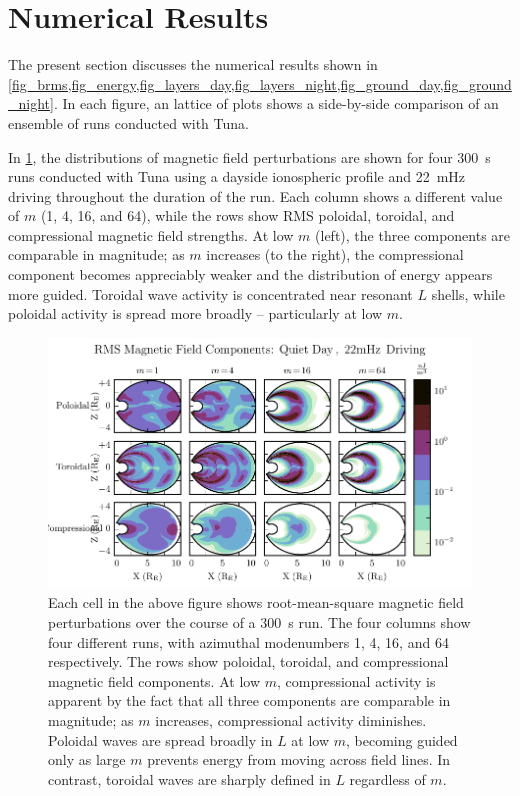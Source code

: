 \documentclass[draft,linenumbers]{agujournal}
\begin{document}

\section{Numerical Results}

The present section discusses the numerical results shown in \cref{fig_brms,fig_energy,fig_layers_day,fig_layers_night,fig_ground_day,fig_ground_night}. In each figure, an lattice of plots shows a side-by-side comparison of an ensemble of runs conducted with Tuna.

In \cref{fig_brms}, the distributions of magnetic field perturbations are shown for four \SI{300}{\second} runs conducted with Tuna using a dayside ionospheric profile and \SI{22}{\mHz} driving throughout the duration of the run. Each column shows a different value of $m$ (1, 4, 16, and 64), while the rows show RMS poloidal, toroidal, and compressional magnetic field strengths. At low $m$ (left), the three components are comparable in magnitude; as $m$ increases (to the right), the compressional component becomes appreciably weaker and the distribution of energy appears more guided. Toroidal wave activity is concentrated near resonant $L$ shells, while poloidal activity is spread more broadly -- particularly at low $m$.

\begin{figure}
    \begin{center}
    \includegraphics[width=\textwidth]{figures/fig_brms.pdf}
    \caption{
        Each cell in the above figure shows root-mean-square magnetic field perturbations over the course of a \SI{300}{\s} run. The four columns show four different runs, with azimuthal modenumbers 1, 4, 16, and 64 respectively. The rows show poloidal, toroidal, and compressional magnetic field components. At low $m$, compressional activity is apparent by the fact that all three components are comparable in magnitude; as $m$ increases, compressional activity diminishes. Poloidal waves are spread broadly in $L$ at low $m$, becoming guided only as large $m$ prevents energy from moving across field lines. In contrast, toroidal waves are sharply defined in $L$ regardless of $m$.
    }
    \label{fig_brms}
    \end{center}
\end{figure}
\end{document}
